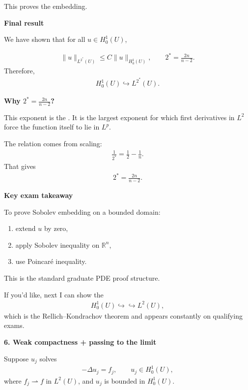\documentclass[12pt,a4paper]{report}
\begin{document}
\begin{description}
\begin{description}
This proves the embedding.

\item \textbf{Final result}

We have shown that for all $u\in H_0^1(U)$,

\begin{align*}
\boxed{
\|u\|_{L^{2^*}(U)} \le C\|u\|_{H_0^1(U)}, \qquad 2^*=\frac{2n}{n-2}.
}
\end{align*}
Therefore,
\begin{align*}
\boxed{
H_0^1(U)\hookrightarrow L^{2^*}(U).
}
\end{align*}

\item \textbf{Why $2^*=\frac{2n}{n-2}$?}

This exponent is the .
It is the largest exponent for which first derivatives in $L^2$ force the function itself to lie in $L^p$.

The relation comes from scaling:
\begin{align*}
\frac1{2^*}=\frac12-\frac1n.
\end{align*}
That gives
\begin{align*}
2^*=\frac{2n}{n-2}.
\end{align*}

\item \textbf{Key exam takeaway}

To prove Sobolev embedding on a bounded domain:

\begin{enumerate}
\item extend $u$ by zero,
\item apply Sobolev inequality on $\mathbb R^n$,
\item use Poincaré inequality.
\end{enumerate}

This is the standard graduate PDE proof structure.

\end{description}

If you'd like, next I can show the 
\begin{align*}
H_0^1(U)\hookrightarrow\hookrightarrow L^2(U),
\end{align*}
which is the Rellich–Kondrachov theorem and appears constantly on qualifying exams.


\newpage\item \textbf{6. Weak compactness + passing to the limit}

Suppose $u_j$ solves
\begin{align*}
-\Delta u_j=f_j,\qquad u_j\in H_0^1(U),
\end{align*}
where $f_j\rightharpoonup f$ in $L^2(U)$, and $u_j$ is bounded in $H_0^1(U)$.


\end{description}
\end{document}
